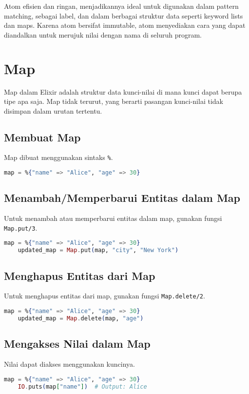 Atom efisien dan ringan, menjadikannya ideal untuk digunakan dalam pattern matching, sebagai label, dan dalam berbagai struktur data seperti keyword lists dan maps. Karena atom bersifat immutable, atom menyediakan cara yang dapat diandalkan untuk merujuk nilai dengan nama di seluruh program.

\section{Map}
Map dalam Elixir adalah struktur data kunci-nilai di mana kunci dapat berupa tipe apa saja. Map tidak terurut, yang berarti pasangan kunci-nilai tidak disimpan dalam urutan tertentu.

\subsection{Membuat Map}
Map dibuat menggunakan sintaks \texttt{\%{}}.
\begin{lstlisting}[language=Elixir]
	map = %{"name" => "Alice", "age" => 30}
\end{lstlisting}

\subsection{Menambah/Memperbarui Entitas dalam Map}
Untuk menambah atau memperbarui entitas dalam map, gunakan fungsi \texttt{Map.put/3}.
\begin{lstlisting}[language=Elixir]
	map = %{"name" => "Alice", "age" => 30}
	updated_map = Map.put(map, "city", "New York")
\end{lstlisting}

\subsection{Menghapus Entitas dari Map}
Untuk menghapus entitas dari map, gunakan fungsi \texttt{Map.delete/2}.
\begin{lstlisting}[language=Elixir]
	map = %{"name" => "Alice", "age" => 30}
	updated_map = Map.delete(map, "age")
\end{lstlisting}

\subsection{Mengakses Nilai dalam Map}
Nilai dapat diakses menggunakan kuncinya.
\begin{lstlisting}[language=Elixir]
	map = %{"name" => "Alice", "age" => 30}
	IO.puts(map["name"])  # Output: Alice
\end{lstlisting}

